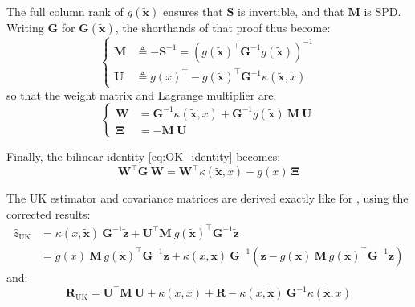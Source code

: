The full column rank of $g(\tilde{\mathbf{x}})$ ensures that $\mathbf{S}$ is invertible, and that $\mathbf{M}$ is SPD. Writing $\mathbf{G}$ for $\mathbf{G}(\tilde{\mathbf{x}})$, the shorthands of that proof thus become:
\begin{equation}
	\left\{\begin{aligned}
	\mathbf{M}&\triangleq-\mathbf{S}^{-1}=\left(g(\tilde{\mathbf{x}})^\top \mathbf{G}^{-1}g(\tilde{\mathbf{x}})\right)^{-1}\\
	\mathbf{U}&\triangleq g(x)^\top-g(\tilde{\mathbf{x}})^\top \mathbf{G}^{-1}\kappa(\tilde{\mathbf{x}},x)
	\end{aligned}\right.
\end{equation}
so that the weight matrix and Lagrange multiplier are:
\begin{equation}
	\left\{\begin{aligned}
	\mathbf{W}&=\mathbf{G}^{-1}\kappa(\tilde{\mathbf{x}},x)+\mathbf{G}^{-1}g(\tilde{\mathbf{x}})\:\mathbf{M}\:\mathbf{U}\\
	\boldsymbol{\Xi}&=-\mathbf{M}\:\mathbf{U}
	\end{aligned}\right.
\end{equation}

Finally, the bilinear identity \eqref{eq:OK_identity} becomes:
\begin{equation}
	\mathbf{W}^\top \mathbf{G}\:\mathbf{W}=\mathbf{W}^\top \kappa(\tilde{\mathbf{x}},x)-g(x)\:\boldsymbol{\Xi}
\end{equation}

The UK estimator and covariance matrices are derived exactly like for , using the corrected results:
\begin{equation}
	\begin{aligned}
	\hat{z}_{\mathrm{UK}}&=\kappa(x,\tilde{\mathbf{x}})\:\mathbf{G}^{-1}\tilde{\mathbf{z}}+\mathbf{U}^\top \mathbf{M}\:g(\tilde{\mathbf{x}})^\top \mathbf{G}^{-1}\tilde{\mathbf{z}}\\
	&=g(x)\:\mathbf{M}\:g(\tilde{\mathbf{x}})^\top \mathbf{G}^{-1}\tilde{\mathbf{z}}+\kappa(x,\tilde{\mathbf{x}})\:\mathbf{G}^{-1}\left(\tilde{\mathbf{z}}-g(\tilde{\mathbf{x}})\:\mathbf{M}\:g(\tilde{\mathbf{x}})^\top \mathbf{G}^{-1}\tilde{\mathbf{z}}\right)
	\end{aligned}\label{eq:UK_z_proof}
\end{equation}
and:
\begin{equation}
	\mathbf{R}_{\mathrm{UK}}=\mathbf{U}^\top \mathbf{M}\:\mathbf{U}+\kappa(x,x)+\mathbf{R}-\kappa(x,\tilde{\mathbf{x}})\:\mathbf{G}^{-1}\kappa(\tilde{\mathbf{x}},x)\label{eq:UK_R_proof}
\end{equation}

